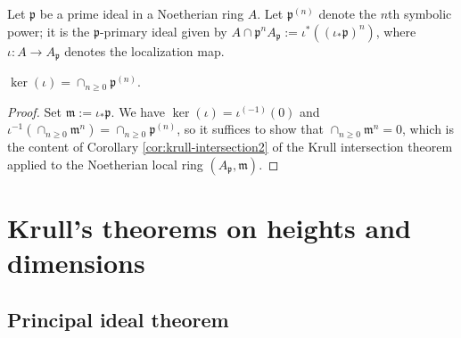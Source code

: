 \documentclass[reqno]{amsart} 
\begin{document}
Let \(\mathfrak{p}\) be a prime ideal in a Noetherian ring \(A\).
Let \(\mathfrak{p}^{(n)}\) denote the $n$th symbolic power;
it is the $\mathfrak{p}$-primary ideal
given by \(A \cap \mathfrak{p}^n A_\mathfrak{p} := \iota^*(
  (\iota_* \mathfrak{p} )^n)\),
where \(\iota : A \rightarrow A_\mathfrak{p}\) denotes the
localization map.
\begin{theorem}
  $\ker(\iota) = \cap_{n \geq 0} \mathfrak{p}^{(n)}$.
\end{theorem}
\begin{proof}
  Set $\mathfrak{m} := \iota_* \mathfrak{p}$.  We have
  $\ker(\iota) = \iota^{(-1)}(0)$ and
  $\iota^{-1}(\cap_{n \geq 0} \mathfrak{m}^n) = \cap_{n \geq 0}
  \mathfrak{p}^{(n)}$, so it suffices to show that
  $\cap_{n \geq 0} \mathfrak{m}^n = 0$, which is the content of
  Corollary \ref{cor:krull-intersection2} of the Krull
  intersection theorem applied to the Noetherian local ring
  $(A_\mathfrak{p},\mathfrak{m})$.
\end{proof}


\section{Krull's theorems on heights and dimensions}
\label{sec:orgd3770e5}
\subsection{Principal ideal theorem}
\label{sec:orgb8870ab}
\end{document}
